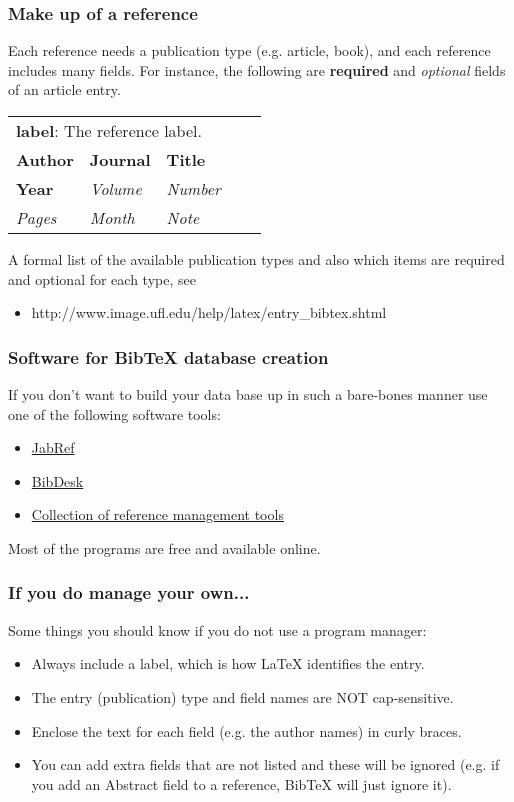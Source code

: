 \begin{frame}  \frametitle{Make up of a reference}
	Each reference needs a publication type (e.g. article, book), and each reference includes many fields. For instance, the following are \textbf{required} and \textit{optional} fields of an article entry.
	\begin{center}
		\begin{tabular}{lllrr}
			\multicolumn{5}{l}{\textbf{label}: The reference label.} \\
			\textbf{Author} & \textbf{Journal} & \textbf{Title} & \hspace{5mm} & \\
			\textbf{Year} & \textit{Volume} & \textit{Number} \\
			\textit{Pages} & \textit{Month} & \textit{Note}
		\end{tabular}
	\end{center}
	A formal list of the available publication types and also which items are required and optional for each type, see
	\begin{itemize}
		\item[]\color{highlight}http://www.image.ufl.edu/help/latex/entry\_bibtex.shtml
	\end{itemize}
\end{frame}

\begin{frame}  \frametitle{Software for BibTeX database creation}
	If you don't want to build your data base up in such a bare-bones manner use one of the following software tools:
	\begin{itemize}
		\item \href{http://jabref.sourceforge.net/}{JabRef}
		\item \href{http://bibdesk.sourceforge.net/}{BibDesk}
		\item \href{https://en.wikipedia.org/wiki/Comparison\_of\_reference\_management\_software}{Collection of reference management tools}
	\end{itemize}
	Most of the programs are free and available online.
\end{frame}

\begin{frame}  \frametitle{If you do manage your own...}
	Some things you should know if you do not use a program manager:
	\begin{itemize}
		\item Always include a label, which is how LaTeX identifies the entry.
		\item The entry (publication) type and field names are NOT cap-sensitive.
		\item Enclose the text for each field (e.g. the author names) in curly braces.
		\item You can add extra fields that are not listed and these will be ignored (e.g. if you add an Abstract field to a reference, BibTeX will just ignore it).
	\end{itemize}
\end{frame}

